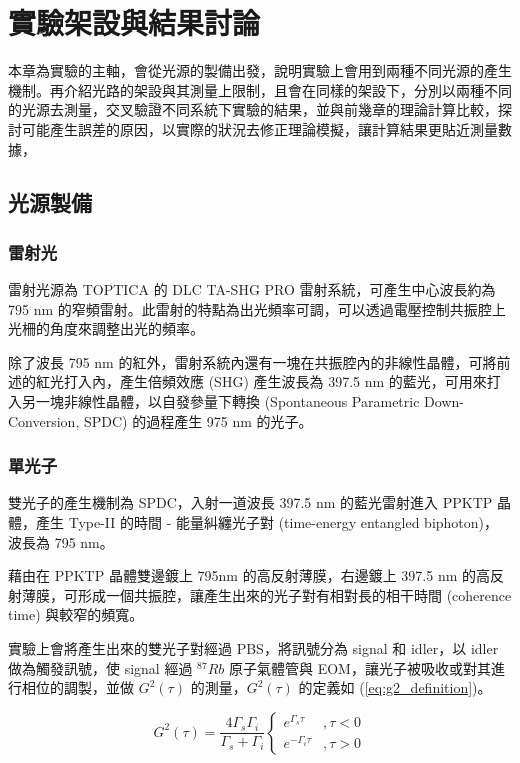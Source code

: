 \documentclass[class=NCU_thesis, crop=false]{standalone}
\begin{document}
\chapter{實驗架設與結果討論}
本章為實驗的主軸，會從光源的製備出發，說明實驗上會用到兩種不同光源的產生機制。再介紹光路的架設與其測量上限制，且會在同樣的架設下，分別以兩種不同的光源去測量，交叉驗證不同系統下實驗的結果，並與前幾章的理論計算比較，探討可能產生誤差的原因，以實際的狀況去修正理論模擬，讓計算結果更貼近測量數據，

\section{光源製備}

\subsection{雷射光}
雷射光源為 TOPTICA 的 DLC TA-SHG PRO 雷射系統，可產生中心波長約為 795 nm 的窄頻雷射。此雷射的特點為出光頻率可調，可以透過電壓控制共振腔上光柵的角度來調整出光的頻率。

除了波長 795 nm 的紅外，雷射系統內還有一塊在共振腔內的非線性晶體，可將前述的紅光打入內，產生倍頻效應 (SHG) 產生波長為 397.5 nm 的藍光，可用來打入另一塊非線性晶體，以自發參量下轉換 (Spontaneous Parametric Down-Conversion, SPDC) 的過程產生 975 nm 的光子。


\subsection{單光子}
\label{subsection:single_photon}
雙光子的產生機制為 SPDC，入射一道波長 397.5 nm 的藍光雷射進入 PPKTP 晶體，產生 Type-II 的時間 - 能量糾纏光子對 (time-energy entangled biphoton)，波長為 795 nm。

藉由在 PPKTP 晶體雙邊鍍上 795nm 的高反射薄膜，右邊鍍上 397.5 nm 的高反射薄膜，可形成一個共振腔，讓產生出來的光子對有相對長的相干時間 (coherence time) 與較窄的頻寬。

實驗上會將產生出來的雙光子對經過 PBS，將訊號分為 signal 和 idler，以 idler 做為觸發訊號，使 signal 經過 $^{87}Rb$ 原子氣體管與 EOM，讓光子被吸收或對其進行相位的調製，並做 $G^{2}(\tau)$ 的測量，$G^{2}(\tau)$ 的定義如 (\ref{eq:g2_definition})。

\begin{equation}
    G^{2}(\tau)=\frac{4\Gamma_{s}\Gamma_{i}}{\Gamma_{s}+\Gamma_{i}}\left\{\begin{matrix}
        e^{\Gamma_{s}\tau} & ,\tau<0\\
        e^{-\Gamma_{i}\tau} & ,\tau>0
        \end{matrix}\right.
\label{eq:g2_definition}
\end{equation}
\end{document}
